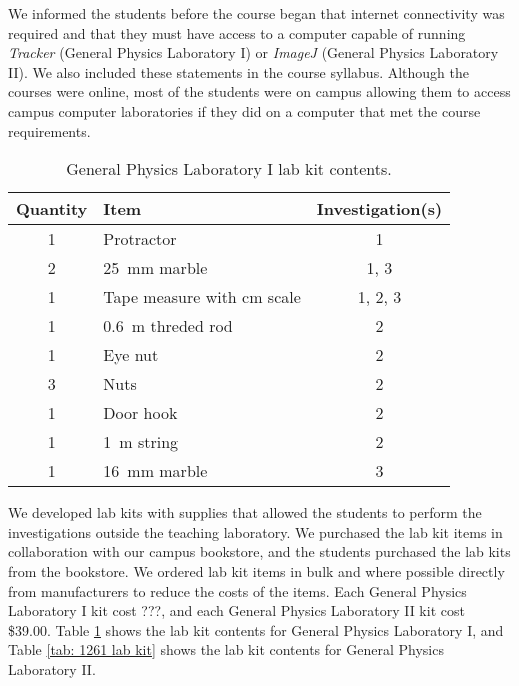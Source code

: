 \documentclass[aip, numerical, preprint]{revtex4-2}
\begin{document}
We informed the students before the course began that internet connectivity was required and
that they must have access to a computer capable of running \emph{Tracker} (General Physics Laboratory
I) or \emph{ImageJ} (General Physics Laboratory II). We also included these statements in the course
syllabus. Although the courses were online, most of the students were on campus allowing them
to access campus computer laboratories if they did on a computer that met the course
requirements.
  
\begin{table}
  \caption{\label{tab: 1251 lab kit} General Physics Laboratory I lab kit contents.}
  \begin{tabular}{clc}
    \hline\hline
    Quantity & Item & Investigation(s)\\
    \hline
    1 & Protractor & 1 \\
    2 & \SI{25}{mm} marble & 1, 3 \\
    1 & Tape measure with cm scale & 1, 2, 3\\
    1 & \SI{0.6}{m} threded rod & 2 \\
    1 & Eye nut & 2 \\
    3 & Nuts & 2 \\
    1 & Door hook & 2 \\
    1 & \SI{1}{m} string & 2 \\
    1 & \SI{16}{mm} marble & 3 \\
    \hline\hline
  \end{tabular}
\end{table}

We developed lab kits with supplies that allowed the students to perform the investigations
outside the teaching laboratory. We purchased the lab kit items in collaboration with our
campus bookstore, and the students purchased the lab kits from the bookstore. We ordered lab
kit items in bulk and where possible directly from manufacturers to reduce the costs of the
items. Each General Physics Laboratory I kit cost ???, and each General Physics Laboratory II
kit cost \$39.00. Table \ref{tab: 1251 lab kit} shows the lab kit contents for General Physics
Laboratory I, and Table \ref{tab: 1261 lab kit} shows the lab kit contents for General Physics
Laboratory II.
\end{document}
